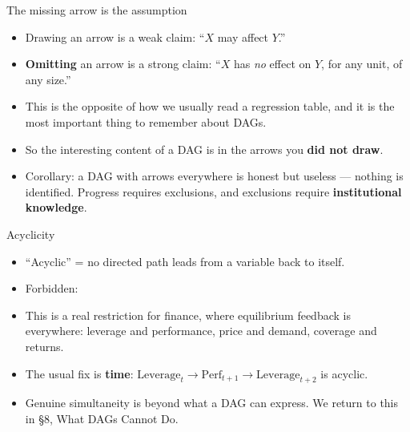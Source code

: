 \documentclass[
  11pt,
  ignorenonframetext,
  aspectratio=169,
]{beamer}
\providecommand{\tightlist}{%
  \setlength{\itemsep}{0pt}\setlength{\parskip}{0pt}}
\begin{document}
\begin{frame}{The missing arrow is the assumption}
\protect{}\label{the-missing-arrow-is-the-assumption}
\begin{itemize}
\tightlist
\item
  Drawing an arrow is a weak claim: ``\(X\) may affect \(Y\).''
\item
  \textbf{Omitting} an arrow is a strong claim: ``\(X\) has \emph{no}
  effect on \(Y\), for any unit, of any size.''
\item
  This is the opposite of how we usually read a regression table, and it
  is the most important thing to remember about DAGs.
\item
  So the interesting content of a DAG is in the arrows you \textbf{did
  not draw}.
\item
  Corollary: a DAG with arrows everywhere is honest but useless ---
  nothing is identified. Progress requires exclusions, and exclusions
  require \textbf{institutional knowledge}.
\end{itemize}
\end{frame}

\begin{frame}{Acyclicity}
\protect{}\label{acyclicity}
\begin{itemize}
\tightlist
\item
  ``Acyclic'' = no directed path leads from a variable back to itself.
\item
  Forbidden:
\end{itemize}

\begin{center}
\end{center}

\begin{itemize}
\tightlist
\item
  This is a real restriction for finance, where equilibrium feedback is
  everywhere: leverage and performance, price and demand, coverage and
  returns.
\item
  The usual fix is \textbf{time}:
  \(\text{Leverage}_t \to \text{Perf}_{t+1} \to \text{Leverage}_{t+2}\)
  is acyclic.
\item
  Genuine simultaneity is beyond what a DAG can express. We return to
  this in §8, What DAGs Cannot Do.
\end{itemize}
\end{frame}
\end{document}
